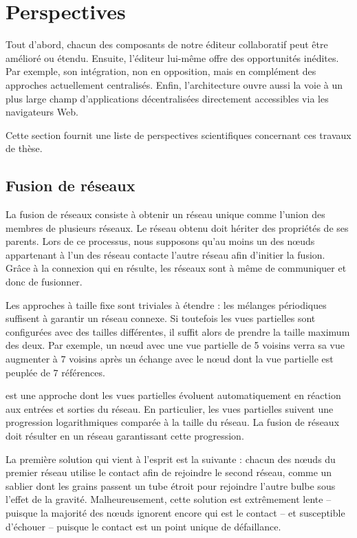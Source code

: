 
\section{Perspectives}
\label{conclu:sec:perspectives}

Tout d'abord, chacun des composants de notre éditeur collaboratif peut être
amélioré ou étendu. Ensuite, l'éditeur lui-même offre des opportunités
inédites. Par exemple, son intégration, non en opposition, mais en complément
des approches actuellement centralisés. Enfin, l'architecture ouvre aussi la
voie à un plus large champ d'applications décentralisées directement
accessibles via les navigateurs Web.

\noindent  Cette section fournit une liste de
perspectives scientifiques concernant ces travaux de thèse.

\subsection{Fusion de réseaux}

\label{conclu:subsec:merging}

La fusion de réseaux consiste à obtenir un réseau unique comme l'union des
membres de plusieurs réseaux. Le réseau obtenu doit hériter des propriétés de
ses parents.  Lors de ce processus, nous supposons qu'au moins un des nœuds
appartenant à l'un des réseau contacte l'autre réseau afin d'initier la
fusion. Grâce à la connexion qui en résulte, les réseaux sont à même de
communiquer et donc de fusionner.

Les approches à taille fixe sont triviales à étendre : les mélanges périodiques
suffisent à garantir un réseau connexe. Si toutefois les vues partielles sont
configurées avec des tailles différentes, il suffit alors de prendre la taille
maximum des deux. Par exemple, un nœud avec une vue partielle de 5 voisins verra
sa vue augmenter à $7$ voisins après un échange avec le nœud dont la vue
partielle est peuplée de $7$ références.

\SPRAY est une approche dont les vues partielles évoluent automatiquement en
réaction aux entrées et sorties du réseau. En particulier, les vues partielles
suivent une progression logarithmiques comparée à la taille du réseau. La fusion
de réseaux \SPRAY doit résulter en un réseau \SPRAY garantissant cette
progression.

La première solution qui vient à l'esprit est la suivante : chacun des nœuds du
premier réseau utilise le contact afin de rejoindre le second réseau, comme un
sablier dont les grains passent un tube étroit pour rejoindre l'autre bulbe sous
l'effet de la gravité. Malheureusement, cette solution est extrêmement lente --
puisque la majorité des nœuds ignorent encore qui est le contact -- et
susceptible d'échouer -- puisque le contact est un point unique de défaillance.

